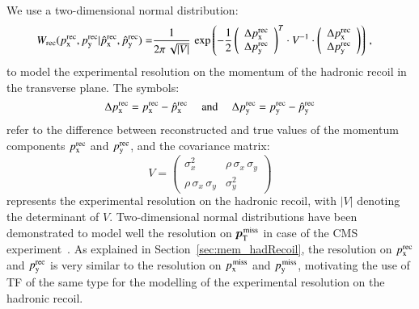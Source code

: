 We use a two-dimensional normal distribution:
\begin{align}
W_{\textrm{rec}}( p_{\textrm{x}}^{\textrm{rec}},p_{\textrm{y}}^{\textrm{rec}} | \hat{p}_{\textrm{x}}^{\textrm{rec}},\hat{p}_{\textrm{y}}^{\textrm{rec}} ) = & 
  \frac{1}{2\pi \, \sqrt{\vert V \vert}} \, \exp \left( -\frac{1}{2}
  \left( \begin{array}{c} \Delta p_{\textrm{x}}^{\textrm{rec}} \\ \Delta p_{\textrm{y}}^{\textrm{rec}} \end{array} \right)^{T}
  \cdot V^{-1} \cdot
   \left( \begin{array}{c} \Delta p_{\textrm{x}}^{\textrm{rec}} \\ \Delta p_{\textrm{y}}^{\textrm{rec}} \end{array} \right)
  \right) \, ,
\label{eq:tf_hadRecoil}
\end{align}
to model the experimental resolution on the momentum of
the hadronic recoil in the transverse plane.
The symbols:
\begin{equation}
\Delta p_{\textrm{x}}^{\textrm{rec}} = p_{\textrm{x}}^{\textrm{rec}} - \hat{p}_{\textrm{x}}^{\textrm{rec}} \quad \mbox{ and } \quad
\Delta p_{\textrm{y}}^{\textrm{rec}} = p_{\textrm{y}}^{\textrm{rec}} - \hat{p}_{\textrm{y}}^{\textrm{rec}} 
\label{eq:tf_hadRecoil_delta}
\end{equation}
refer to the difference between reconstructed and true values of the
momentum components $p_{\textrm{x}}^{\textrm{rec}}$ and $p_{\textrm{y}}^{\textrm{rec}}$,
and the covariance matrix:
\begin{equation}
V = \left( \begin{array}{cc} \sigma_{x}^{2} & \rho \, \sigma_{x} \, \sigma_{y} \\ \rho \, \sigma_{x} \, \sigma_{y} & \sigma_{y}^{2} \end{array} \right) 
\label{eq:tf_hadRecoil_V}
\end{equation}
represents the experimental resolution on the hadronic recoil,
with $\vert V \vert$ denoting the determinant of $V$.
Two-dimensional normal distributions have been demonstrated to model well the resolution on $\bm{p}_{\textrm{T}}^{\textrm{\kern0.10em miss}}$ in case of the CMS experiment~\cite{CMS-JME-10-009,CMS-JME-13-003}.
As explained in Section~\ref{sec:mem_hadRecoil}, the resolution on
$p_{\textrm{x}}^{\textrm{rec}}$ and $p_{\textrm{y}}^{\textrm{rec}}$ is very similar to the resolution on $p_{\textrm{x}}^{\textrm{\kern0.10em miss}}$ and $p_{\textrm{y}}^{\textrm{\kern0.10em miss}}$,
motivating the use of TF of the same type for the modelling of the experimental resolution on the hadronic recoil.

